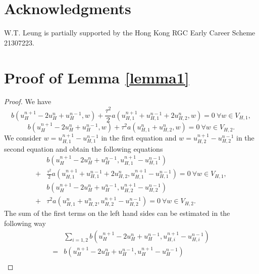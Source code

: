 \documentclass[preprint,12pt]{elsarticle}
\begin{document}
\section*{Acknowledgments}
W.T. Leung is partially supported by the Hong Kong RGC Early Career Scheme 21307223.
\appendix
\section{Proof of Lemma \ref{lemma1}} \label{appl1}
\begin{proof}
    We have 
\begin{equation}\label{1.111}
    b\left(u_{H}^{n+1}-2u_{H}^{n}+u_{H}^{n-1},w\right)+\frac{\tau^2}{2}a\left(u_{H,1}^{n+1}+u_{H,1}^{n-1}+2u_{H,2}^{n},w\right)=0~ \forall w \in V_{H,1},
\end{equation}
\begin{equation}\label{1.112}
    b\left(u_{H}^{n+1}-2u_{H}^{n}+u_{H}^{n-1},w\right)+\tau^2 a\left(u_{H,1}^{n}+u_{H,2}^{n},w\right)=0~\forall w \in V_{H,2}.
\end{equation}
We consider $w=u_{H,1}^{n+1}-u_{H,1}^{n-1}$ in the first equation and $w=u_{H,2}^{n+1}-u_{H,2}^{n-1}$ in the second equation and obtain the following equations
\begin{equation}\label{1.113}
\begin{aligned}
    &b\left(u_{H}^{n+1}-2u_{H}^{n}+u_{H}^{n-1},u_{H,1}^{n+1}-u_{H,1}^{n-1}\right)\\
    +&\frac{\tau^2}{2}a\left(u_{H,1}^{n+1}+u_{H,1}^{n-1}+2u_{H,2}^{n},u_{H,1}^{n+1}-u_{H,1}^{n-1}\right)=0~ \forall w \in V_{H,1},\\
    &b\left(u_{H}^{n+1}-2u_{H}^{n}+u_{H}^{n-1},u_{H,2}^{n+1}-u_{H,2}^{n-1}\right)\\
    +&\tau^2 a\left(u_{H,1}^{n}+u_{H,2}^{n},u_{H,2}^{n+1}-u_{H,2}^{n-1}\right)=0~\forall w \in V_{H,2}.
\end{aligned}
\end{equation}
The sum of the first terms on the left hand sides can be estimated in the following way 
\begin{equation}\label{1.115}
\begin{aligned}
    &\sum_{i=1,2}b(u_H^{n+1}-2u_H^n+u_H^{n-1},u_{H,i}^{n+1}-u_{H,i}^{n-1})\\
    =&b(u_H^{n+1}-2u_H^n+u_H^{n-1},u_{H}^{n+1}-u_{H}^{n-1})\\

\end{aligned}
\end{equation}
\end{proof}
\end{document}
